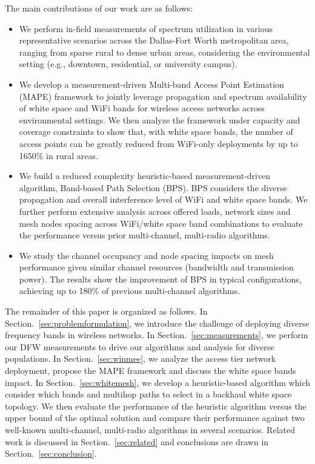 The main contributions of our work are as follows:
\begin{itemize}
\item We perform in-field measurements of spectrum utilization in various representative
scenarios across the Dallas-Fort Worth metropolitan area, ranging from sparse rural to dense urban areas,  
considering the environmental setting (e.g., downtown, residential, or university campus).
\item We develop a measurement-driven Multi-band Access Point Estimation (MAPE) framework 
to jointly leverage propagation and spectrum availability of white space and WiFi bands 
for wireless access networks across environmental settings. We then analyze the framework under capacity and 
coverage constraints to show that, with white space bands, the number of access points 
can be greatly reduced from WiFi-only deployments by up to 1650\% in rural areas. 
\item We build a reduced complexity heuristic-based measurement-driven algorithm, Band-based 
Path Selection (BPS). BPS considers the diverse propagation and overall interference level 
of WiFi and white space bands. 
We further perform extensive analysis across offered loads,
network sizes and mesh nodes spacing across WiFi/white space band combinations to evaluate the 
performance versus prior multi-channel, multi-radio algorithms. 
\item We study the channel occupancy and node spacing impacts on mesh performance given similar 
channel resources (bandwidth and transmission power). The results show the improvement of BPS 
in typical configurations, achieving up to 180\% of previous multi-channel algorithms.
\end{itemize}

The remainder of this paper is organized as follows. In Section.~\ref{sec:problemformulation}, 
we introduce the challenge of deploying diverse frequency bands in wireless networks. 
In Section.~\ref{sec:measurements}, we perform our DFW measurements to drive our algorithms and analysis
for diverse populations. 
In Section.~\ref{sec:winmee}, we analyze the access tier network deployment, 
propose the MAPE framework and discuss the white space bands impact. 
In Section.~\ref{sec:whitemesh}, we develop a heuristic-based algorithm which consider which bands 
and multihop paths to select in a backhaul white space topology. We then evaluate the performance of 
the heuristic algorithm versus the upper bound of the optimal solution and 
compare their performance against two well-known multi-channel, multi-radio 
algorithms in several scenarios. Related work is discussed in Section.~\ref{sec:related} and conclusions 
are drawn in Section.~\ref{sec:conclusion}.

